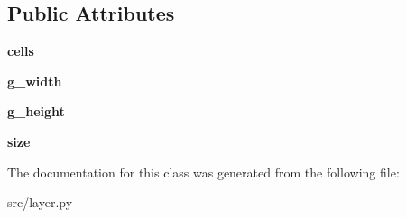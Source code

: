 \subsection*{Public Attributes}
\begin{DoxyCompactItemize}
\item 
\hypertarget{classsrc_1_1layer_1_1_layer_a9b228afc78fa22b3aed57cc426b53956}{}\label{classsrc_1_1layer_1_1_layer_a9b228afc78fa22b3aed57cc426b53956} 
{\bfseries cells}
\item 
\hypertarget{classsrc_1_1layer_1_1_layer_af2a57c9ef96b6855db07ec0cd3dca58e}{}\label{classsrc_1_1layer_1_1_layer_af2a57c9ef96b6855db07ec0cd3dca58e} 
{\bfseries g\+\_\+width}
\item 
\hypertarget{classsrc_1_1layer_1_1_layer_a627dbe4baccfa8b611aa6286677b3d80}{}\label{classsrc_1_1layer_1_1_layer_a627dbe4baccfa8b611aa6286677b3d80} 
{\bfseries g\+\_\+height}
\item 
\hypertarget{classsrc_1_1layer_1_1_layer_ab51fb62aca8248f38b3f3dfe7206fe87}{}\label{classsrc_1_1layer_1_1_layer_ab51fb62aca8248f38b3f3dfe7206fe87} 
{\bfseries size}
\end{DoxyCompactItemize}


The documentation for this class was generated from the following file\+:\begin{DoxyCompactItemize}
\item 
src/layer.\+py\end{DoxyCompactItemize}
